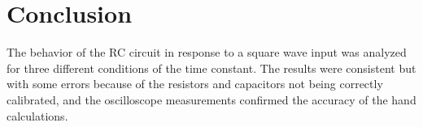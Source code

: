 \documentclass[a4paper,12pt]{article}
\begin{document}
\section*{Conclusion}
The behavior of the RC circuit in response to a square wave input was analyzed for three different conditions of the time constant. The results were consistent but with some errors because of the resistors and capacitors not being correctly calibrated, and the oscilloscope measurements confirmed the accuracy of the hand calculations. 
\end{document}
